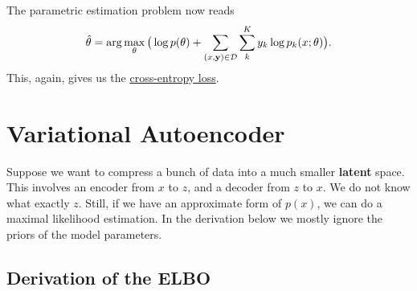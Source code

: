 \documentclass[hyperref, a4paper, 12pt]{report}
\newcommand*{\argmax}{\arg\max}
\newcommand*{\concept}[1]{{\textbf{#1}}}
\begin{document}
The parametric estimation problem now reads
\begin{equation}
    \hat{\theta} = \argmax_\theta \big( \log p(\theta) + \sum_{(x, \vb{y}) \in \mathcal{D}} \sum_{k}^{K} y_k \log p_k(x; \theta) \big).
\end{equation}
This, again, gives us the \uline{cross-entropy loss}.


\section{Variational Autoencoder}

Suppose we want to compress a bunch of data into a much smaller \concept{latent} space.
This involves an encoder from $x$ to $z$, and a decoder from $z$ to $x$.
We do not know what exactly $z$.
Still, if we have an approximate form of $p(x)$,
we can do a maximal likelihood estimation.
In the derivation below we mostly ignore the priors of the model parameters.

\subsection{Derivation of the ELBO}
\end{document}

